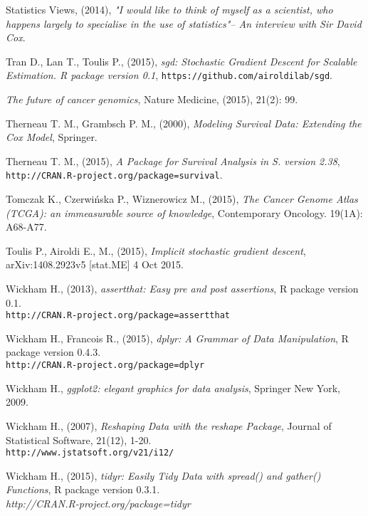 \begin{thebibliography}{99}
 Statistics Views, (2014), \textit{ "I would like to think of myself as a scientist, who happens largely to specialise in the use of statistics"– An interview with Sir David Cox}.

 Tran D., Lan T., Toulis P., (2015), \textit{sgd: Stochastic Gradient Descent for Scalable Estimation. R package version 0.1}, \texttt{https://github.com/airoldilab/sgd}.


 \textit{The future of cancer genomics}, Nature Medicine, (2015), 21(2): 99.

 Therneau T. M., Grambsch P. M., (2000), \textit{Modeling Survival Data: Extending the Cox Model}, Springer.

 Therneau T. M., (2015), \textit{A Package for Survival Analysis in S. version 2.38}, \\ \texttt{http://CRAN.R-project.org/package=survival}.


 Tomczak K., Czerwińska P., Wiznerowicz M., (2015), \textit{The Cancer Genome Atlas (TCGA): an immeasurable source of knowledge}, Contemporary Oncology. 19(1A): A68-A77.


 Toulis P.,Airoldi E., M., (2015), \textit{Implicit stochastic gradient descent}, arXiv:1408.2923v5 [stat.ME] 4 Oct 2015.


 Wickham H., (2013), \textit{assertthat: Easy pre and post assertions}, R package version 0.1. \\ \texttt{http://CRAN.R-project.org/package=assertthat}

  Wickham H., Francois R., (2015), \textit{dplyr: A Grammar of Data Manipulation}, R package version 0.4.3. \\  \texttt{http://CRAN.R-project.org/package=dplyr}

 Wickham H., \textit{ggplot2: elegant graphics for data analysis}, Springer New York, 2009.

 Wickham H., (2007), \textit{Reshaping Data with the reshape Package}, Journal of Statistical Software, 21(12), 1-20. \\ \texttt{http://www.jstatsoft.org/v21/i12/}

 Wickham H., (2015), \textit{tidyr: Easily Tidy Data with spread() and gather() Functions}, R package version 0.3.1. \\  \textit{http://CRAN.R-project.org/package=tidyr}


\end{thebibliography}

